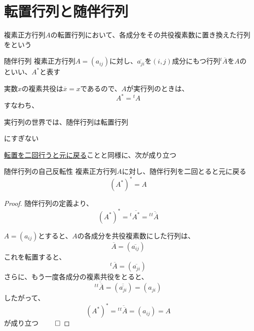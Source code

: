 \documentclass[../../../topic_linear-algebra]{subfiles}
\begin{document}
\sectionline
\section{転置行列と随伴行列}

複素正方行列$A$の転置行列において、各成分をその共役複素数に置き換えた行列をという

\begin{definition}{随伴行列}
  複素正方行列$A = (a_{ij})$に対し、$\overline{a_{ji}}$を$(i,j)$成分にもつ行列${}^t\overline{A}$を$A$のといい、$A^*$と表す
\end{definition}

実数$x$の複素共役は$\overline{x} = x$であるので、$A$が実行列のときは、
\begin{equation*}
  A^* = {}^t A
\end{equation*}
すなわち、
\begin{shaded}
  実行列の世界では、随伴行列は転置行列
\end{shaded}
にすぎない

\sectionline

\hyperref[thm:transpose-involution]{転置を二回行うと元に戻る}ことと同様に、次が成り立つ

\begin{theorem}{随伴行列の自己反転性}\label{thm:adjoint-involution}
  複素正方行列$A$に対し、随伴行列を二回とると元に戻る
  \begin{equation*}
    (A^*)^* = A
  \end{equation*}
\end{theorem}

\begin{proof}
  随伴行列の定義より、
  \begin{equation*}
    (A^*)^* = {}^t\overline{A^*} = {}^t\overline{{}^t\overline{A}}
  \end{equation*}

  $A = (a_{ij})$とすると、$A$の各成分を共役複素数にした行列は、
  \begin{equation*}
    \overline{A} = (\overline{a_{ij}})
  \end{equation*}
  これを転置すると、
  \begin{equation*}
    {}^t\overline{A} = (\overline{a_{ji}})
  \end{equation*}
  さらに、もう一度各成分の複素共役をとると、
  \begin{equation*}
    {}^t\overline{{}^t\overline{A}} = (\overline{\overline{a_{ji}}}) = (a_{ji})
  \end{equation*}
  したがって、
  \begin{equation*}
    (A^*)^* = {}^t\overline{{}^t\overline{A}} = (a_{ij}) = A
  \end{equation*}
  が成り立つ $\qed$
\end{proof}
\end{document}
